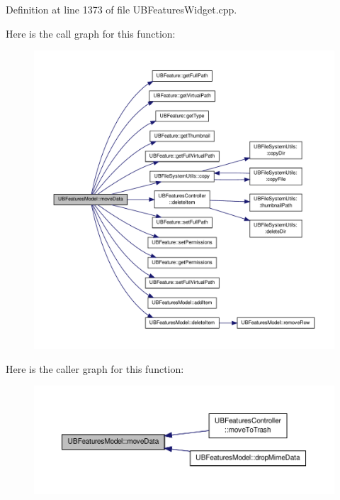 Definition at line 1373 of file U\-B\-Features\-Widget.\-cpp.



Here is the call graph for this function\-:
\nopagebreak
\begin{figure}[H]
\begin{center}
\leavevmode
\includegraphics[width=350pt]{d5/d7a/class_u_b_features_model_ad30ab5e1a702838c8664cbfcebad1606_cgraph}
\end{center}
\end{figure}




Here is the caller graph for this function\-:
\nopagebreak
\begin{figure}[H]
\begin{center}
\leavevmode
\includegraphics[width=350pt]{d5/d7a/class_u_b_features_model_ad30ab5e1a702838c8664cbfcebad1606_icgraph}
\end{center}
\end{figure}


